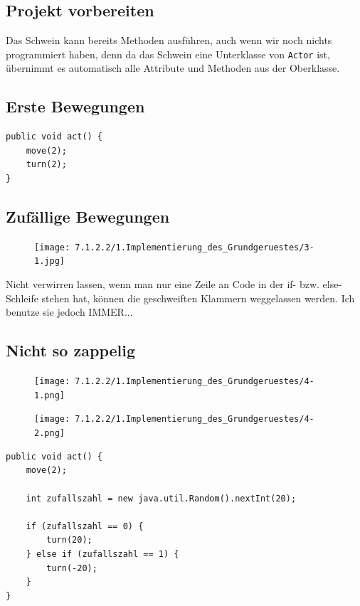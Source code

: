 \documentclass{scrartcl}   %
\begin{document}
\subsection{Projekt vorbereiten}

Das Schwein kann bereits Methoden ausführen, auch wenn wir noch nichts programmiert haben, denn da das Schwein eine Unterklasse von \texttt{Actor} ist, übernimmt es automatisch alle Attribute und Methoden aus der Oberklasse.

\subsection{Erste Bewegungen}

\begin{lstlisting}
public void act() {
    move(2);
    turn(2);
}
\end{lstlisting}

\subsection{Zufällige Bewegungen}

\begin{figure}[ht]
	\centering
	\texttt{[image: 7.1.2.2/1.Implementierung\_des\_Grundgeruestes/3-1.jpg]}
\end{figure}

Nicht verwirren lassen, wenn man nur eine Zeile an Code in der if- bzw. else-Schleife stehen hat, können die geschweiften Klammern weggelassen werden. Ich benutze sie jedoch IMMER...

\newpage

\subsection{Nicht so zappelig}

\begin{figure}[ht]
	\centering
	\texttt{[image: 7.1.2.2/1.Implementierung\_des\_Grundgeruestes/4-1.png]}
\end{figure}

\begin{figure}[ht]
	\centering
	\texttt{[image: 7.1.2.2/1.Implementierung\_des\_Grundgeruestes/4-2.png]}
\end{figure}

\newpage

\begin{lstlisting}
public void act() {
    move(2);
    
    int zufallszahl = new java.util.Random().nextInt(20);
    
    if (zufallszahl == 0) {
        turn(20);
    } else if (zufallszahl == 1) { 
        turn(-20);
    }
}    
\end{lstlisting}
\end{document}
